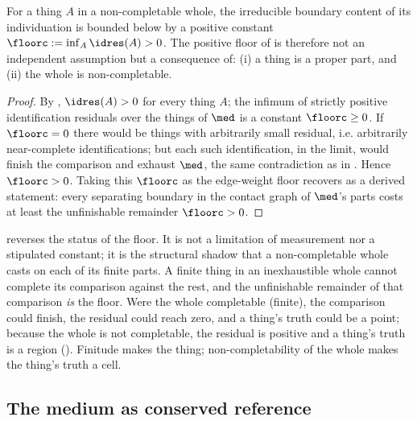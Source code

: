\begin{corollary}
\label{cor:floor-derived}
For a thing $A$ in a non-completable whole, the irreducible boundary content of
its individuation is bounded below by a positive constant
$\floorc:=\inf_A\idres(A)>0$. The positive floor of  is therefore
not an independent assumption but a consequence of: \textup{(}i\textup{)} a thing
is a proper part, and \textup{(}ii\textup{)} the whole is non-completable.
\end{corollary}

\begin{proof}
By , $\idres(A)>0$ for every thing $A$; the infimum of
strictly positive identification residuals over the things of $\med$ is a
constant $\floorc\ge0$. If $\floorc=0$ there would be things with arbitrarily
small residual, i.e. arbitrarily near-complete identifications; but each such
identification, in the limit, would finish the comparison and exhaust $\med$, the
same contradiction as in . Hence $\floorc>0$. Taking
this $\floorc$ as the edge-weight floor recovers  as a derived
statement: every separating boundary in the contact graph of $\med$'s parts costs
at least the unfinishable remainder $\floorc>0$.
\end{proof}

\begin{remark}
\label{rem:floor-trace}
 reverses the status of the floor. It is not a
limitation of measurement nor a stipulated constant; it is the structural
shadow that a non-completable whole casts on each of its finite parts. A finite
thing in an inexhaustible whole cannot complete its comparison against the rest,
and the unfinishable remainder of that comparison \emph{is} the floor. Were the
whole completable \textup{(}finite\textup{)}, the comparison could finish, the
residual could reach zero, and a thing's truth could be a point; because the
whole is not completable, the residual is positive and a thing's truth is a
region \textup{(}\textup{)}. Finitude makes the thing;
non-completability of the whole makes the thing's truth a cell.
\end{remark}

\subsection{The medium as conserved reference}

